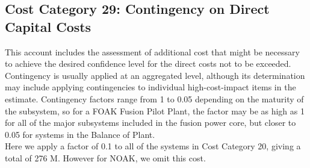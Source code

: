 \subsection{Cost Category 29: Contingency on Direct Capital Costs}

This account includes the assessment of additional cost that might be necessary to achieve the desired confidence level for the direct costs not to be exceeded. Contingency is usually applied at an aggregated level, although its determination may include applying contingencies to individual high-cost-impact items in the estimate.  Contingency factors range from 1 to 0.05 depending on the maturity of the subsystem, so for a FOAK Fusion Pilot Plant, the factor may be as high as 1 for all of the major subsystems included in the fusion power core, but closer to 0.05 for systems in the Balance of Plant.  \\

Here we apply a factor of 0.1 to all of the systems in Cost Category 20, giving a total of  276 M. {\color{blue} However for NOAK, we omit this cost.}

